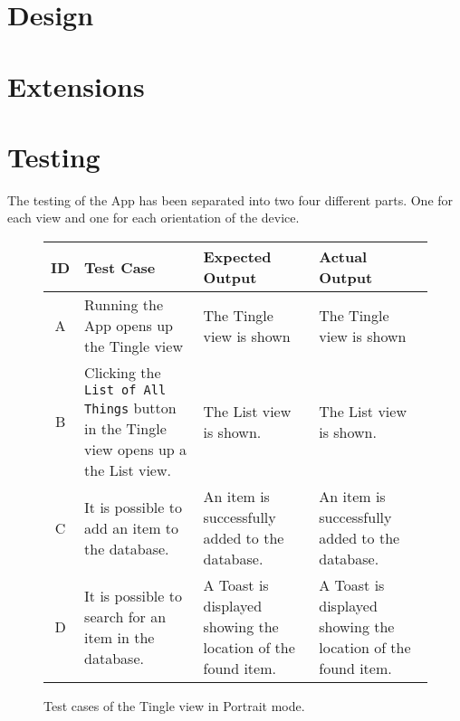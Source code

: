 \section{Design}


\section{Extensions }


\section{Testing}
The testing of the App has been separated into two four different parts. One for each view and one for each orientation of the device. 

\begin{figure}[H]
	\renewcommand*{\arraystretch}{1.5} %
	\begin{tabular}{| c | p{3.5cm} | p{3.5cm} | p{3.5cm} |}
		\hline
		{\textbf{ID} } & {\textbf{Test Case} } & {\textbf{Expected Output}} & {\textbf {Actual Output}} \\\hline\hline
		A & Running the App opens up the Tingle view & The Tingle view is shown & The Tingle view is shown  \\ \hline
		B &	Clicking the \texttt{List of All Things} button in the Tingle view opens up a the List view. & The List view is shown. & The List view is shown. \\ \hline
		C & It is possible to add an item to the database. & An item is successfully added to the database. & An item is successfully added to the database. \\ \hline
		D & It is possible to search for an item in the database. & A Toast is displayed showing the location of the found item. & A Toast is displayed showing the location of the found item. \\ \hline
	\end{tabular}
	
	\caption{Test cases of the Tingle view in Portrait mode.}
	\label{tab:test-cases-tingle-portrait}
\end{figure}

